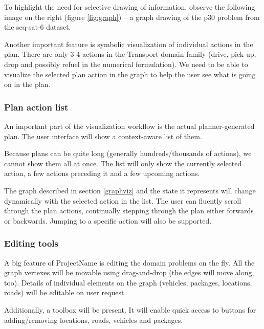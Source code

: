 \documentclass[10pt,a4paper,oneside]{article}
\newcommand{\pname}{ProjectName} %
\begin{document}
To highlight the need for selective drawing of information, observe the following image on the right (figure \ref{fig:graph}) -- a graph drawing of the p30 problem from the seq-sat-6 dataset.

Another important feature is symbolic visualization of individual actions in the plan.
There are only 3-4 actions in the Transport domain family (drive, pick-up, drop and possibly refuel in the numerical formulation).
We need to be able to visualize the selected plan action in the graph to help the user see what is going on in the plan.


\subsubsection{Plan action list}

An important part of the visualization workflow is the actual planner-generated plan.
The user interface will show a context-aware list of them.

Because plans can be quite long (generally hundreds/thousands of actions),
we cannot show them all at once.
The list will only show the currently selected action, a few actions preceding it and a few upcoming actions.

The graph described in section \ref{graphviz} and the state it represents will change dynamically with the selected action in the list. The user can fluently scroll through the plan actions, continually stepping through the plan either forwards or backwards.
Jumping to a specific action will also be supported.

\subsubsection{Editing tools}

A big feature of \pname{} is editing the domain problems on the fly.
All the graph vertexes will be movable using drag-and-drop (the edges will move along, too).
Details of individual elements on the graph (vehicles, packages, locations, roads) will be editable
on user request.

Additionally, a toolbox will be present. It will enable quick access to buttons for adding/removing locations, roads, vehicles and packages.
\end{document}
